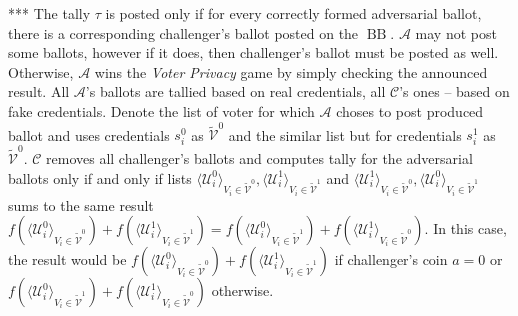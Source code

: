 \documentclass[12pt]{article}
\DeclareMathOperator{\bb}{BB}
\begin{document}
*** The tally $\tau$ is posted only if for every correctly formed adversarial ballot, there is a corresponding challenger's ballot posted on the $\bb$. $\mathcal{A}$ may not post some ballots, however if it does, then challenger's ballot must be posted as well. Otherwise, $\mathcal{A}$ wins the \textit{Voter Privacy} game by simply checking the announced result.  All $\mathcal{A}$'s ballots are tallied based on real credentials, all  $\mathcal{C}$'s ones -- based on fake credentials. Denote the list of voter for which $\mathcal{A}$ choses to post produced ballot and uses credentials $s_i^0$  as $ \tilde{\mathcal{V}}^0$ and the similar list but for credentials $s_i^1$ as $ \tilde{\mathcal{V}}^0$.   $\mathcal{C}$ removes all challenger's ballots and computes tally for the adversarial ballots only if and only if  lists $\langle \mathcal{U}^0_i \rangle _{V_i \in \tilde{\mathcal{V}}^0}, \langle \mathcal{U}^1_i \rangle _{V_i \in \tilde{\mathcal{V}}^1}$ and $\langle \mathcal{U}^1_i \rangle _{V_i \in \tilde{\mathcal{V}}^0}, \langle \mathcal{U}^0_i \rangle _{V_i \in \tilde{\mathcal{V}}^1}$ sums to the same result $f(\langle \mathcal{U}^0_i \rangle _{V_i \in \tilde{\mathcal{V}}^0} ) + f(\langle \mathcal{U}^1_i \rangle _{V_i \in \tilde{\mathcal{V}}^1} ) =  f(\langle \mathcal{U}^0_i \rangle _{V_i \in \tilde{\mathcal{V}}^1} ) +  f(\langle \mathcal{U}^1_i \rangle _{V_i \in \tilde{\mathcal{V}}^0} )$. In this case, the result would be $f(\langle \mathcal{U}^0_i \rangle _{V_i \in \tilde{\mathcal{V}}^0} ) + f(\langle \mathcal{U}^1_i \rangle _{V_i \in \tilde{\mathcal{V}}^1} )$ if challenger's coin $a=0$ or  $f(\langle \mathcal{U}^0_i \rangle _{V_i \in \tilde{\mathcal{V}}^1} ) +  f(\langle \mathcal{U}^1_i \rangle _{V_i \in \tilde{\mathcal{V}}^0} )$ otherwise.\\
\end{document}
